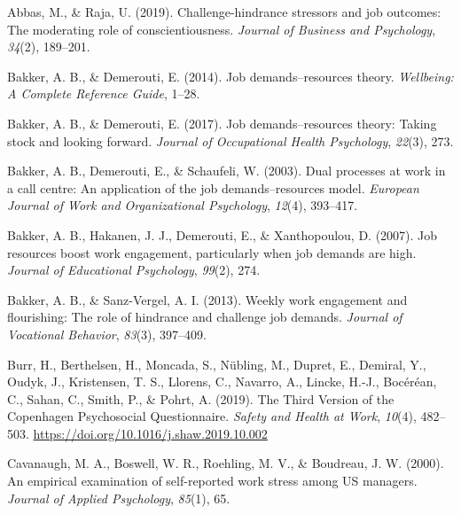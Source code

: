 \documentclass[
  man]{apa6}
\newlength{\cslhangindent}
\newlength{\cslentryspacingunit} %
\newenvironment{CSLReferences}[2] %
 {%
  \setlength{\parindent}{0pt}
  \ifodd #1
  \let\oldpar\par
  \def\par{\hangindent=\cslhangindent\oldpar}
  \fi
  \setlength{\parskip}{#2\cslentryspacingunit}
 }%
 {}
\begin{document}
\hypertarget{refs}{}
\begin{CSLReferences}{1}{0}
\leavevmode{}%
Abbas, M., \& Raja, U. (2019). Challenge-hindrance stressors and job outcomes: The moderating role of conscientiousness. \emph{Journal of Business and Psychology}, \emph{34}(2), 189--201.

\leavevmode{}%
Bakker, A. B., \& Demerouti, E. (2014). Job demands--resources theory. \emph{Wellbeing: A Complete Reference Guide}, 1--28.

\leavevmode{}%
Bakker, A. B., \& Demerouti, E. (2017). Job demands--resources theory: Taking stock and looking forward. \emph{Journal of Occupational Health Psychology}, \emph{22}(3), 273.

\leavevmode{}%
Bakker, A. B., Demerouti, E., \& Schaufeli, W. (2003). Dual processes at work in a call centre: An application of the job demands--resources model. \emph{European Journal of Work and Organizational Psychology}, \emph{12}(4), 393--417.

\leavevmode{}%
Bakker, A. B., Hakanen, J. J., Demerouti, E., \& Xanthopoulou, D. (2007). Job resources boost work engagement, particularly when job demands are high. \emph{Journal of Educational Psychology}, \emph{99}(2), 274.

\leavevmode{}%
Bakker, A. B., \& Sanz-Vergel, A. I. (2013). Weekly work engagement and flourishing: The role of hindrance and challenge job demands. \emph{Journal of Vocational Behavior}, \emph{83}(3), 397--409.

\leavevmode{}%
Burr, H., Berthelsen, H., Moncada, S., Nübling, M., Dupret, E., Demiral, Y., Oudyk, J., Kristensen, T. S., Llorens, C., Navarro, A., Lincke, H.-J., Bocéréan, C., Sahan, C., Smith, P., \& Pohrt, A. (2019). The {Third} {Version} of the {Copenhagen} {Psychosocial} {Questionnaire}. \emph{Safety and Health at Work}, \emph{10}(4), 482--503. \url{https://doi.org/10.1016/j.shaw.2019.10.002}

\leavevmode{}%
Cavanaugh, M. A., Boswell, W. R., Roehling, M. V., \& Boudreau, J. W. (2000). An empirical examination of self-reported work stress among US managers. \emph{Journal of Applied Psychology}, \emph{85}(1), 65.


\end{CSLReferences}
\end{document}
